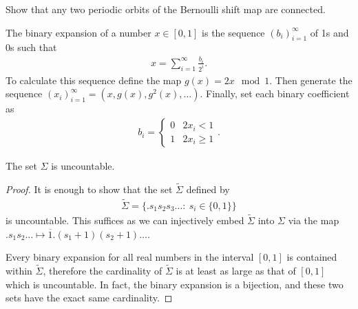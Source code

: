 \begin{exercise}
Show that any two periodic orbits of the Bernoulli shift map are connected.
\end{exercise}

\begin{definition}
	The binary expansion of a number $x\in [0,1]$ is the sequence $(b_i)_{i=1}^{\infty }$ of 1s and 0s  such that 
	\begin{align}
		x = \sum_{i=1}^{\infty } \frac{b_i}{2^i}.
	\end{align}
	To calculate this sequence define the map $g(x) = 2x \mod 1$. Then generate the sequence $(x_i)_{i=1}^{\infty }=(x, g(x), g^2(x), \ldots)$. Finally, set each binary coefficient as
	 \begin{align}
		b_i =
		\begin{cases}
			0 & 2x_i < 1 \\
			1 & 2x_i \geq 1
		\end{cases}.
	\end{align}
	
\end{definition}
\begin{proposition}[]
	The set $\Sigma$ is uncountable.
\end{proposition}
\begin{proof}
	It is enough to show that the set $\tilde{\Sigma}$ defined by 
	 \begin{align}
		 \tilde{\Sigma} = \{ \bm{.} s_1s_2s_3 \ldots:\ s_i\in \{0,1\}\}
	\end{align}
	is uncountable. This suffices as we can injectively embed $\tilde{\Sigma}$ into $\Sigma$ via the map $\bm{.} s_1s_2\ldots \mapsto \overline{1}\bm{.} (s_1+1)(s_2+1)\ldots$.

	Every binary expansion for all real numbers in the interval $[0,1]$ is contained within $\tilde{\Sigma}$, therefore the cardinality of $\tilde{\Sigma}$ is at least as large as that of $[0,1]$ which is uncountable. In fact, the binary expansion is a bijection, and these two sets have the exact same cardinality. 
\end{proof}

